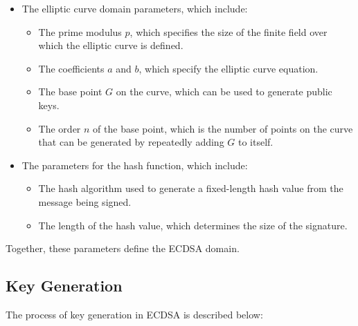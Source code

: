 \documentclass[main\_\_EN.tex]{subfiles}
\begin{document}
\begin{itemize}
    \item The elliptic curve domain parameters, which include:
            \begin{itemize}
                \item The prime modulus $p$, which specifies the size of the finite field over which the elliptic curve is defined.
                \item The coefficients $a$ and $b$, which specify the elliptic curve equation.
                \item The base point $G$ on the curve, which can be used to generate public keys.
                \item The order $n$ of the base point, which is the number of points on the curve that can be generated by repeatedly adding $G$ to itself.
            \end{itemize}
    \item The parameters for the hash function, which include:
          \begin{itemize}
              \item The hash algorithm used to generate a fixed-length hash value from the message being signed.
              \item The length of the hash value, which determines the size of the signature.
          \end{itemize}
\end{itemize}

Together, these parameters define the ECDSA domain.

\subsection{Key Generation}

The process of key generation in ECDSA is described below:
\end{document}

